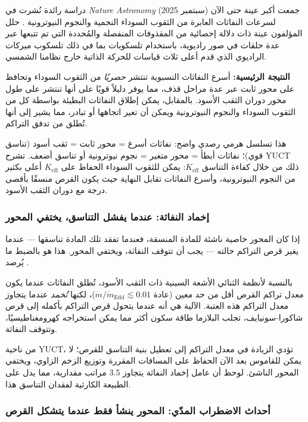 \documentclass[12pt,a4paper]{article}
\begin{document}
	دراسة رائدة نُشرت في \emph{Nature Astronomy} (سبتمبر 2025) جمعت أكبر عينة حتى الآن لسرعات النفاثات العابرة من الثقوب السوداء النجمية والنجوم النيوترونية \cite{NatureAstronomy2025}. حلل المؤلفون عينة ذات دلالة إحصائية من المقذوفات المنفصلة والمُحددة التي تم تتبعها عبر عدة حلقات في صور راديوية، باستخدام تلسكوبات بما في ذلك تلسكوب ميركات الراديوي الذي قدم أعلى ثلاث قياسات للحركة الذاتية خارج نظامنا الشمسي.
	
	\textbf{النتيجة الرئيسية:} أسرع النفاثات النسبوية تنتشر \emph{حصريًا} من الثقوب السوداء وتحافظ على محور ثابت عبر عدة مراحل قذف، مما يوفر دليلاً قويًا على أنها تنتشر على طول محور دوران الثقب الأسود. بالمقابل، يمكن إطلاق النفاثات البطيئة بواسطة كل من الثقوب السوداء والنجوم النيوترونية ويمكن أن تغير اتجاهها أو تبادر، مما يشير إلى أنها تُطلق من تدفق التراكم.
	
	هذا تسلسل هرمي رصدي واضح: نفاثات أسرع = محور ثابت = ثقب أسود (تناسق قوي)؛ نفاثات أبطأ = محور متغير = نجوم نيوترونية أو تناسق أضعف. تشرح YUCT ذلك من خلال كفاءة التناسق \(K_{\mathrm{eff}}\): يمكن للثقوب السوداء الحفاظ على \(K_{\mathrm{eff}}\) أعلى بكثير من النجوم النيوترونية، وأسرع النفاثات تقابل النهاية حيث يكون القرص منسقًا بأقصى درجة مع دوران الثقب الأسود.
	
	\subsubsection{إخماد النفاثة: عندما يفشل التناسق، يختفي المحور}
	
	إذا كان المحور خاصية ناشئة للمادة المنسقة، فعندما تفقد تلك المادة تناسقها — عندما يغير قرص التراكم حالته — يجب أن تتوقف النفاثة، ويختفي المحور. هذا هو بالضبط ما يُرصد \cite{JetQuenching2006,JetQuenching2018}.
	
	بالنسبة لأنظمة الثنائي الأشعة السينية ذات الثقب الأسود، تُطلق النفاثات عندما يكون معدل تراكم القرص أقل من حد معين (عادة \(\dot{m}/\dot{m}_{\text{Edd}} \lesssim 0.01\))، لكنها \emph{تُخمد} عندما يتجاوز معدل التراكم هذه العتبة. الآلية هي أنه عندما يتحول قرص التراكم بأكمله إلى قرص شاكورا-سونيايف، تجلب البلازما طاقة سكون أكثر مما يمكن استخراجه كهرومغناطيسيًا، وتتوقف النفاثة.
	
	من ناحية YUCT، تؤدي الزيادة في معدل التراكم إلى تعطيل بنية التناسق للقرص؛ لا يمكن للقاموس بعد الآن الحفاظ على المسافات المقررة وتوزيع الزخم الزاوي، ويختفي المحور الناشئ. لوحظ أن عامل إخماد النفاثة يتجاوز 3.5 مراتب مقدارية، مما يدل على الطبيعة الكارثية لفقدان التناسق هذا.
	
	\subsubsection{أحداث الاضطراب المدّي: المحور ينشأ فقط عندما يتشكل القرص}
	
\end{document}
